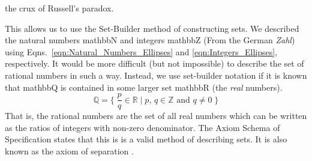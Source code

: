         the crux of Russell's paradox.
        \par\hfill\par
        This allows us to use the Set-Builder method
        of constructing sets. We described the natural numbers \gls{mathbbN} and
        integers \gls{mathbbZ} (From the German \textit{Zahl}) using
        Eqns.~\ref{eqn:Natural_Numbers_Ellipses} and
        \ref{eqn:Integers_Ellipses}, respectively. It would be more difficult
        (but not impossible) to describe the set of rational numbers%
         in such a way. Instead, we use set-builder
        notation if it is known that \gls{mathbbQ} is contained in some larger
        set \gls{mathbbR} (the \textit{real} numbers).
        \begin{equation}
            \mathbb{Q}=\Big\{\;\frac{p}{q}\in\mathbb{R}\;\big|\;
                                p,\,q\in\mathbb{Z}\textrm{ and }q\ne{0}\;\Big\}
        \end{equation}
        That is, the rational numbers are the set of all real numbers which can
        be written as the ratios of integers with non-zero denominator. The
        Axiom Schema of Specification states that this is is a valid method of
        describing sets. It is also known as the axiom of separation%
        .
